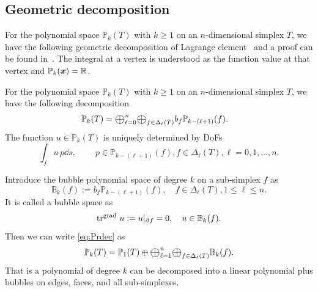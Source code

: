 \documentclass[mathpazo]{cicp}
\newcommand{\Oplus}{\ensuremath{\vcenter{\hbox{\scalebox{1.5}{$\oplus$}}}}}
\begin{document}
 

\subsection{Geometric decomposition}
For the polynomial space $\mathbb P_k(T)$ with $k\geq 1$ on an $n$-dimensional simplex $T$, we have the following geometric decomposition of Lagrange element~\cite[(2.6)]{ArnoldFalkWinther2009} and a proof can be found in~\cite{Chen;Huang:2021Geometric}. The integral at a vertex is understood as the function value at that vertex and $\mathbb P_k({\boldsymbol x}) = \mathbb R$.

\begin{theorem}\label{thm:Lagrangedec}
For the polynomial space $\mathbb P_k(T)$ with $k\geq 1$ on an $n$-dimensional simplex $T$, we have the following decomposition %
\begin{align}
\label{eq:Prdec}
\mathbb P_k(T) &= \Oplus_{\ell = 0}^n\Oplus_{f\in \Delta_{\ell}(T)} b_f\mathbb P_{k - (\ell +1)} (f).
\end{align}
The function $u\in \mathbb P_k(T)$ is uniquely determined by DoFs
\begin{equation}\label{eq:dofPr}
\int_f u \, p \dd s, \quad \quad~p\in \mathbb P_{k - (\ell +1)} (f), f\in \Delta_{\ell}(T), \ell = 0,1,\ldots, n.
\end{equation}
\end{theorem}



Introduce the bubble polynomial space of degree $k$ on a sub-simplex $f$ as
$$
\mathbb B_{k}( f) := b_f\mathbb P_{k - (\ell +1)} (f), \quad f\in \Delta_{\ell}(T), 1\leq \ell \leq n.
$$
It is called a bubble space as
$$
\operatorname{tr}^{{\rm grad\,}} u := u|_{\partial f} = 0, \quad u\in \mathbb B_{k}( f).
$$
Then we can write \eqref{eq:Prdec} as
\begin{equation}\label{eq:Lagdecbubble}
\mathbb P_k(T) = \mathbb P_1(T)\oplus \Oplus_{\ell = 1}^n\Oplus_{f\in \Delta_{\ell}(T)} \mathbb B_{k}( f).
\end{equation}
That is a polynomial of degree $k$ can be decomposed into a linear polynomial plus bubbles on edges, faces, and all sub-simplexes. 
\end{document}
